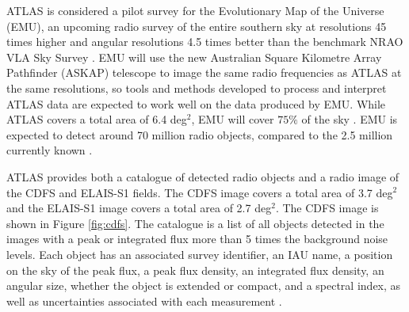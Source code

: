         ATLAS is considered a pilot survey for the Evolutionary Map of the Universe (EMU), an upcoming radio survey of the entire southern sky at resolutions 45 times higher and angular resolutions 4.5 times better than the benchmark NRAO VLA Sky Survey \citep{norris11b}. EMU will use the new Australian Square Kilometre Array Pathfinder (ASKAP) telescope to image the same radio frequencies as ATLAS at the same resolutions, so tools and methods developed to process and interpret ATLAS data are expected to work well on the data produced by EMU. While ATLAS covers a total area of 6.4 deg$^2$, EMU will cover $75\%$ of the sky \citep{norris11b, norris16}. EMU is expected to detect around 70 million radio objects, compared to the 2.5 million currently known \citep{banfield15}.

        ATLAS provides both a catalogue of detected radio objects and a radio image of the CDFS and ELAIS-S1 fields. The CDFS image covers a total area of 3.7 deg$^2$ and the ELAIS-S1 image covers a total area of 2.7 deg$^2$. The CDFS image is shown in Figure \ref{fig:cdfs}. The catalogue is a list of all objects detected in the images with a peak or integrated flux more than 5 times the background noise levels. Each object has an associated survey identifier, an IAU name, a position on the sky of the peak flux, a peak flux density, an integrated flux density, an angular size, whether the object is extended or compact, and a spectral index, as well as uncertainties associated with each measurement \citep{franzen15}.






